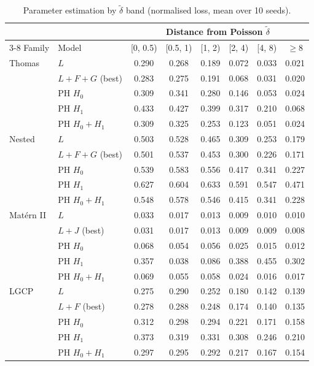 \documentclass[10pt,a4paper]{article}
\newcommand{\dtil}{\tilde\delta}
\begin{document}
\begin{table}[H]
\centering\small
\begin{tabular}{@{}ll cccccc@{}}
\toprule
 & & \multicolumn{6}{c}{Distance from Poisson $\dtil$}\\
\cmidrule(l){3-8}
Family & Model & [0, 0.5) & [0.5, 1) & [1, 2) & [2, 4) & [4, 8) & $\ge 8$\\
\midrule
Thomas & $L$ & 0.290 & 0.268 & 0.189 & 0.072 & 0.033 & 0.021\\
 & $L{+}F{+}G$ (best) & 0.283 & 0.275 & 0.191 & 0.068 & 0.031 & 0.020\\
 & PH $H_0$ & 0.309 & 0.341 & 0.280 & 0.146 & 0.053 & 0.024\\
 & PH $H_1$ & 0.433 & 0.427 & 0.399 & 0.317 & 0.210 & 0.068\\
 & PH $H_0{+}H_1$ & 0.309 & 0.325 & 0.253 & 0.123 & 0.051 & 0.024\\
\midrule
Nested & $L$ & 0.503 & 0.528 & 0.465 & 0.309 & 0.253 & 0.179\\
 & $L{+}F{+}G$ (best) & 0.501 & 0.537 & 0.453 & 0.300 & 0.226 & 0.171\\
 & PH $H_0$ & 0.539 & 0.583 & 0.556 & 0.417 & 0.341 & 0.227\\
 & PH $H_1$ & 0.627 & 0.604 & 0.633 & 0.591 & 0.547 & 0.471\\
 & PH $H_0{+}H_1$ & 0.548 & 0.578 & 0.546 & 0.415 & 0.341 & 0.228\\
\midrule
Mat\'ern II & $L$ & 0.033 & 0.017 & 0.013 & 0.009 & 0.010 & 0.010\\
 & $L{+}J$ (best) & 0.031 & 0.017 & 0.013 & 0.009 & 0.009 & 0.008\\
 & PH $H_0$ & 0.068 & 0.054 & 0.056 & 0.025 & 0.015 & 0.012\\
 & PH $H_1$ & 0.357 & 0.038 & 0.086 & 0.388 & 0.455 & 0.302\\
 & PH $H_0{+}H_1$ & 0.069 & 0.055 & 0.058 & 0.024 & 0.016 & 0.017\\
\midrule
LGCP & $L$ & 0.275 & 0.290 & 0.252 & 0.180 & 0.142 & 0.139\\
 & $L{+}F$ (best) & 0.278 & 0.288 & 0.248 & 0.174 & 0.140 & 0.135\\
 & PH $H_0$ & 0.312 & 0.298 & 0.294 & 0.221 & 0.171 & 0.158\\
 & PH $H_1$ & 0.373 & 0.319 & 0.331 & 0.308 & 0.246 & 0.210\\
 & PH $H_0{+}H_1$ & 0.297 & 0.295 & 0.292 & 0.217 & 0.167 & 0.154\\
\bottomrule
\end{tabular}
\caption{Parameter estimation by $\dtil$ band (normalised loss, mean over 10 seeds).}
\label{tab:params-delta}
\end{table}
\end{document}
